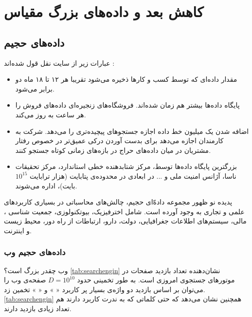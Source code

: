 \chapter{
کاهش بعد و داده‌های بزرگ مقیاس
}


\section{داده‌های حجیم}
عبارات زیر از سایت 
نقل قول شده‌اند
:

\begin{itemize}
\item
مقدار داده‌ای که توسط کسب و کارها ذخیره می‌شود تقریبا هر ۱۲ تا ۱۸ ماه دو برابر می‌شود.
\item
پایگاه داده‌ها بیشتر هم ‌زمان شده‌اند. فروشگاه‌های زنجیره‌ای 
داده‌های فروش را هر ساعت به روز می‌کند.
\item
اضافه شدن یک میلیون خط داده اجازه جستجوهای پیچیده‌تری را می‌دهد. شرکت 
به کارمندان اجازه می‌دهد برای بدست آوردن درکی عمیق‌تر در خصوص رفتار مشتریان در میان داده‌های حراج در بازه‌های زمانی کوتاه جستجو کنند.
\item
بزرگترین پایگاه داده‌ها توسط، مرکز شتابدهنده خطی استاندارد، مرکز تحقیقات ناسا، آژانس امنیت ملی و ... در ابعادی در محدوده‌ی پتابایت (هزار ترابایت 
$10^15$
بایت)، اداره می‌شوند.
\end{itemize}

پدیده نو ظهور مجموعه‌ داده‌ّای حجیم، چالش‌های محاسباتی در بسیاری کاربردهای علمی و تجاری به وجود آورده است. شامل اخترفیزیک، بیوتکنولوزی، جمعیت شناسی
، مالی، سیستم‌های اطلاعات جغرافیایی، دولت، دارو، ارتباطات از راه دور، محیط زیست و اینترنت.

\subsection{داده‌های حجیم وب}

وب چقدر بزرگ است؟  
\autoref{tab:searchengin}
نشان‌دهنده تعداد بازدید صفحات در موتورهای جستجوی امروزی است. به طور تخمینی حدود 
$D = 10^10$
صفحه‌ی وب را می‌توان بر اساس بازدید دو واژه‌ی بسیار پر کاربرد «
» و «
» تخمین زد. 
\autoref{tab:searchengin}
 همچنین نشان می‌دهد که حتی کلماتی که به ندرت کاربرد دارند هم تعداد زیادی بازدید دارند.

